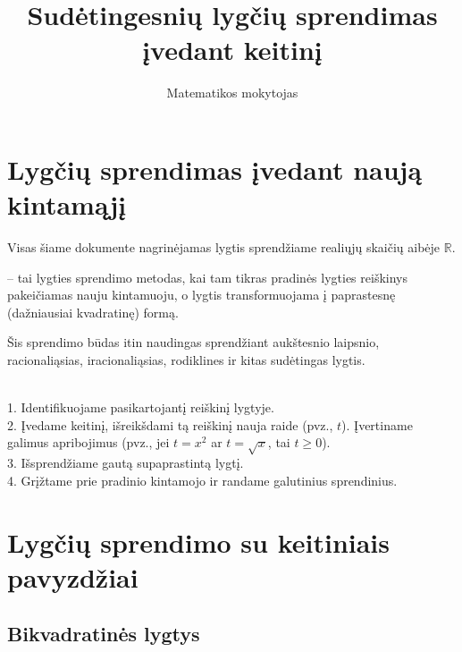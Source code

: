\documentclass[11pt,a4paper]{scrartcl}
\title{Sudėtingesnių lygčių sprendimas įvedant keitinį}
\author{Matematikos mokytojas}
\begin{document}
\maketitle

\section{Lygčių sprendimas įvedant naują kintamąjį}

Visas šiame dokumente nagrinėjamas lygtis sprendžiame realiųjų skaičių aibėje \(\mathbb{R}\).

\begin{definition}
 -- tai lygties sprendimo metodas, kai tam tikras pradinės lygties reiškinys pakeičiamas nauju kintamuoju, o lygtis transformuojama į paprastesnę (dažniausiai kvadratinę) formą.
\end{definition}

Šis sprendimo būdas itin naudingas sprendžiant aukštesnio laipsnio, racionaliąsias, iracionaliąsias, rodiklines ir kitas sudėtingas lygtis. 

\begin{algorithm}
\leavevmode\\
1. Identifikuojame pasikartojantį reiškinį lygtyje.\\
2. Įvedame keitinį, išreikšdami tą reiškinį nauja raide (pvz., \(t\)). Įvertiname galimus apribojimus (pvz., jei \(t=x^2\) ar \(t=\sqrt{x}\), tai \(t \ge 0\)).\\
3. Išsprendžiame gautą supaprastintą lygtį.\\
4. Grįžtame prie pradinio kintamojo ir randame galutinius sprendinius.
\end{algorithm}

\section{Lygčių sprendimo su keitiniais pavyzdžiai}

\subsection{Bikvadratinės lygtys}
\end{document}
